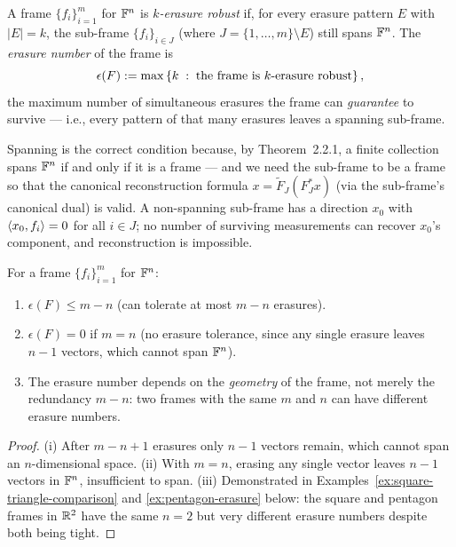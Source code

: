 \begin{definition}
\label{def:k-erasure-robustness}
A frame $\{f_i\}_{i=1}^m$ for $\mathbb{F}^n$ is \emph{$k$-erasure robust} if,
for every erasure pattern $E$ with $|E|=k$, the sub-frame
$\{f_i\}_{i\in J}$ (where $J=\{1,\ldots,m\}\setminus E$) still spans
$\mathbb{F}^n$. The \emph{erasure number} of the frame is
\[
  \epsilon(F) := \max\left\{ k \;:\; \text{the frame is }k\text{-erasure robust} \right\},
\]
the maximum number of simultaneous erasures the frame can \emph{guarantee}
to survive --- i.e., every pattern of that many erasures leaves a spanning
sub-frame.
\end{definition}

\begin{remark*}
Spanning is the correct condition because, by Theorem~2.2.1, a finite
collection spans $\mathbb{F}^n$ if and only if it is a frame --- and we need the
sub-frame to be a frame so that the canonical reconstruction formula
$x = \tilde F_J (F_J^* x)$ (via the sub-frame's canonical dual) is valid.
A non-spanning sub-frame has a direction $x_0$ with
$\left\langle x_0, f_i \right\rangle=0$ for all $i\in J$; no number of surviving
measurements can recover $x_0$'s component, and reconstruction is
impossible.
\end{remark*}

\begin{proposition}
\label{prop:erasure-redundancy}
For a frame $\{f_i\}_{i=1}^m$ for $\mathbb{F}^n$:
\begin{enumerate}[label=(\roman*)]
  \item $\epsilon(F)\le m-n$ (can tolerate at most $m-n$ erasures).
  \item $\epsilon(F)=0$ if $m=n$ (no erasure tolerance, since any single
        erasure leaves $n-1$ vectors, which cannot span $\mathbb{F}^n$).
  \item The erasure number depends on the \emph{geometry} of the frame,
        not merely the redundancy $m-n$: two frames with the same $m$
        and $n$ can have different erasure numbers.
\end{enumerate}
\end{proposition}

\begin{proof}
(i) After $m-n+1$ erasures only $n-1$ vectors remain, which cannot span
an $n$-dimensional space.
(ii) With $m=n$, erasing any single vector leaves $n-1$ vectors in $\mathbb{F}^n$,
insufficient to span.
(iii) Demonstrated in Examples~\ref{ex:square-triangle-comparison} and
\ref{ex:pentagon-erasure} below: the square and pentagon frames in $\mathbb{R}^2$
have the same $n=2$ but very different erasure numbers despite both being
tight.
\end{proof}

